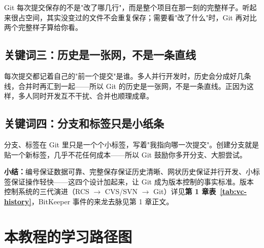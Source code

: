 \documentclass[12pt,a4paper,openany]{ctexbook}
\begin{document}
Git 每次提交保存的不是"改了哪几行"，而是整个项目在那一刻的完整样子。听起来很占空间，其实没变过的文件不会重复保存；需要看"改了什么"时，Git 再对比两个完整样子算给你看。

\subsection{关键词三：历史是一张网，不是一条直线}

每次提交都记着自己的"前一个提交"是谁。多人并行开发时，历史会分成好几条线，合并时再汇到一起——所以 Git 的历史是一张网，不是一条直线。正因为这样，多人同时开发互不干扰、合并也顺理成章。

\subsection{关键词四：分支和标签只是小纸条}

分支、标签在 Git 里只是一个个小标签，写着"我指向哪一次提交"。创建分支就是贴一个新标签，几乎不花任何成本——所以 Git 鼓励你多开分支、大胆尝试。

\medskip
\noindent\textbf{小结：}编号保证数据可靠、完整保存保证历史清晰、网状历史保证并行开发、小标签保证操作轻快——这四个设计加起来，让 Git 成为版本控制的事实标准。版本控制系统的三代演进（RCS $\to$ CVS/SVN $\to$ Git）详见\textbf{第 1 章表~\ref{tab:vc-history}}，BitKeeper 事件的来龙去脉见第 1 章正文。
\medskip

\section{本教程的学习路径图}
\end{document}
